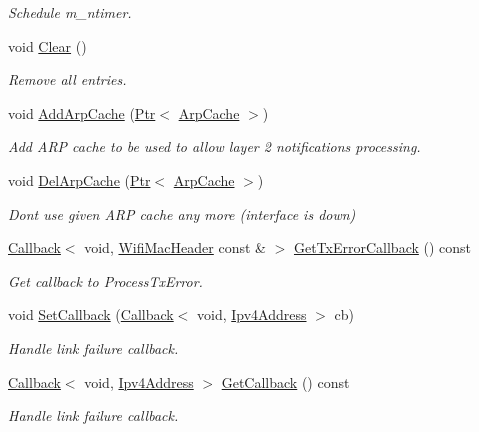 \begin{DoxyCompactItemize}
\begin{DoxyCompactList}\small\item\em Schedule m\+\_\+ntimer. \end{DoxyCompactList}\item 
void \hyperlink{classns3_1_1aodv_1_1Neighbors_a467f3ea5a42d4e32b2fe3bf47bd51991}{Clear} ()
\begin{DoxyCompactList}\small\item\em Remove all entries. \end{DoxyCompactList}\item 
void \hyperlink{classns3_1_1aodv_1_1Neighbors_a6c8226b35d9047d9506d42046689ae94}{Add\+Arp\+Cache} (\hyperlink{classns3_1_1Ptr}{Ptr}$<$ \hyperlink{classns3_1_1ArpCache}{Arp\+Cache} $>$)
\begin{DoxyCompactList}\small\item\em Add A\+RP cache to be used to allow layer 2 notifications processing. \end{DoxyCompactList}\item 
void \hyperlink{classns3_1_1aodv_1_1Neighbors_a9d4cd87eff2d3287c3114c0ad8963b77}{Del\+Arp\+Cache} (\hyperlink{classns3_1_1Ptr}{Ptr}$<$ \hyperlink{classns3_1_1ArpCache}{Arp\+Cache} $>$)
\begin{DoxyCompactList}\small\item\em Don\textquotesingle{}t use given A\+RP cache any more (interface is down) \end{DoxyCompactList}\item 
\hyperlink{classns3_1_1Callback}{Callback}$<$ void, \hyperlink{classns3_1_1WifiMacHeader}{Wifi\+Mac\+Header} const \& $>$ \hyperlink{classns3_1_1aodv_1_1Neighbors_a967f02218f4806c5bbf9ba44ac396601}{Get\+Tx\+Error\+Callback} () const 
\begin{DoxyCompactList}\small\item\em Get callback to Process\+Tx\+Error. \end{DoxyCompactList}\item 
void \hyperlink{classns3_1_1aodv_1_1Neighbors_aa034a98c6f91c1a20db28a4774ea13c5}{Set\+Callback} (\hyperlink{classns3_1_1Callback}{Callback}$<$ void, \hyperlink{classns3_1_1Ipv4Address}{Ipv4\+Address} $>$ cb)
\begin{DoxyCompactList}\small\item\em Handle link failure callback. \end{DoxyCompactList}\item 
\hyperlink{classns3_1_1Callback}{Callback}$<$ void, \hyperlink{classns3_1_1Ipv4Address}{Ipv4\+Address} $>$ \hyperlink{classns3_1_1aodv_1_1Neighbors_ad0ec67edaaef53be2ea9816a679179fc}{Get\+Callback} () const 
\begin{DoxyCompactList}\small\item\em Handle link failure callback. \end{DoxyCompactList}\end{DoxyCompactItemize}

